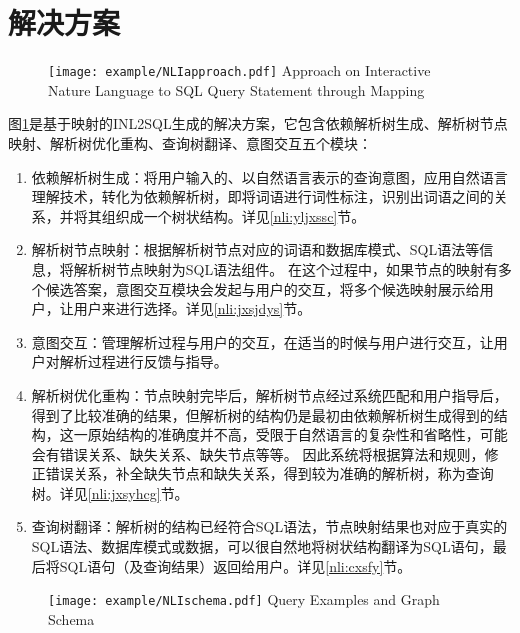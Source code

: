 \section{解决方案}
\begin{figure}[!htp]
    \centering
    \texttt{[image: example/NLIapproach.pdf]}
      {Approach on Interactive Nature Language to SQL Query Statement through Mapping}
    \label{fig:NLIapproach}
  \end{figure}
图\ref{fig:NLIapproach}是基于映射的INL2SQL生成的解决方案，它包含依赖解析树生成、解析树节点映射、解析树优化重构、查询树翻译、意图交互五个模块：
\begin{enumerate}
    \item 依赖解析树生成：将用户输入的、以自然语言表示的查询意图，应用自然语言理解技术，转化为依赖解析树，即将词语进行词性标注，识别出词语之间的关系，并将其组织成一个树状结构。详见\ref{nli:yljxssc}节。
    \item 解析树节点映射：根据解析树节点对应的词语和数据库模式、SQL语法等信息，将解析树节点映射为SQL语法组件。
在这个过程中，如果节点的映射有多个候选答案，意图交互模块会发起与用户的交互，将多个候选映射展示给用户，让用户来进行选择。详见\ref{nli:jxsjdys}节。
    \item 意图交互：管理解析过程与用户的交互，在适当的时候与用户进行交互，让用户对解析过程进行反馈与指导。
    \item 解析树优化重构：节点映射完毕后，解析树节点经过系统匹配和用户指导后，得到了比较准确的结果，但解析树的结构仍是最初由依赖解析树生成得到的结构，这一原始结构的准确度并不高，受限于自然语言的复杂性和省略性，可能会有错误关系、缺失关系、缺失节点等等。
因此系统将根据算法和规则，修正错误关系，补全缺失节点和缺失关系，得到较为准确的解析树，称为查询树。详见\ref{nli:jxsyhcg}节。
    \item 查询树翻译：解析树的结构已经符合SQL语法，节点映射结果也对应于真实的SQL语法、数据库模式或数据，可以很自然地将树状结构翻译为SQL语句，最后将SQL语句（及查询结果）返回给用户。详见\ref{nli:cxsfy}节。
\end{enumerate}

\begin{figure}[!htp]
  \centering
  \texttt{[image: example/NLIschema.pdf]}
    {Query Examples and Graph Schema}
  \label{fig:NLIschema}
\end{figure}

